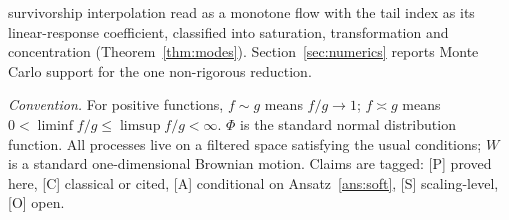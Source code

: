 survivorship interpolation read
as a monotone flow with the tail index as its linear-response
coefficient, classified into saturation, transformation and
concentration (Theorem~\ref{thm:modes}). Section~\ref{sec:numerics}
reports Monte Carlo support for the one non-rigorous reduction.

\emph{Convention.} For positive functions, $f\sim g$ means $f/g\to1$;
$f\asymp g$ means $0<\liminf f/g\le\limsup f/g<\infty$. $\Phi$ is the
standard normal distribution function. All processes live on a
filtered space satisfying the usual conditions; $W$ is a standard
one-dimensional Brownian motion. Claims are tagged: [P] proved here,
[C] classical or cited, [A] conditional on Ansatz~\ref{ans:soft},
[S] scaling-level, [O] open.

